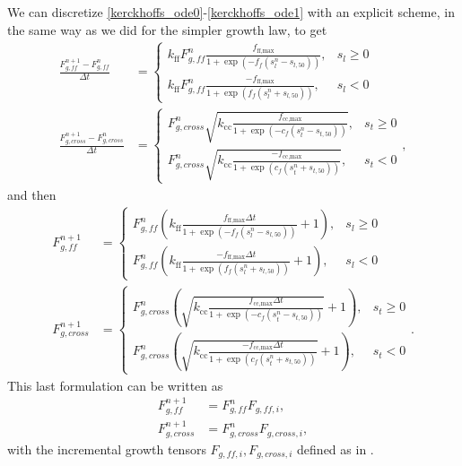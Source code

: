 \documentclass[a4paper,10pt]{article}
\begin{document}
We can discretize \eqref{kerckhoffs_ode0}-\eqref{kerckhoffs_ode1} with an explicit scheme, in the same way as we did for the
simpler growth law, to get
\begin{align}
  \frac{F_{g,ff}^{n+1} - F_{g,ff}^{n}}{\Delta t} &= \begin{cases}
    k_\text{ff} F_{g,ff}^n \frac{f_\text{ff,max} }{1 + \exp(-f_f(s_l^n - s_{l,50}))}, & s_l \geq 0 \\
    k_\text{ff} F_{g,ff}^n \frac{-f_\text{ff,max} }{1 + \exp(f_f(s_l^n + s_{l,50}))}, & s_l < 0
    \end{cases} \label{kerckhoffs_disc0}\\
    \frac{F_{g,cross}^{n+1}- F_{g,cross}^n}{\Delta t} &=
\begin{cases}
  F_{g,cross}^n \sqrt{k_\text{cc} \frac{f_\text{cc,max}  }{1 + \exp(-c_f(s_t^n - s_{t,50}))}}, & s_t \geq 0 \\
  F_{g,cross}^n \sqrt{k_\text{cc} \frac{-f_\text{cc,max} }{1 + \exp(c_f(s_t^n + s_{t,50}))}}, & s_t < 0
\end{cases}, \label{kerckhoffs_disc1}
\end{align}
and then
\begin{align}
  F_{g,ff}^{n+1} &= \begin{cases}
    F_{g,ff}^n (k_\text{ff} \frac{f_\text{ff,max} \Delta t}{1 + \exp(-f_f(s_l^n - s_{l,50}))} + 1), & s_l \geq 0 \\
    F_{g,ff}^n (k_\text{ff} \frac{-f_\text{ff,max} \Delta t}{1 + \exp(f_f(s_l^n + s_{l,50}))} + 1), & s_l < 0
    \end{cases} \label{kerckhoffs_inc0}\\
    F_{g,cross}^{n+1} &=
\begin{cases}
  F_{g,cross}^n (\sqrt{k_\text{cc} \frac{f_\text{cc,max} \Delta t }{1 + \exp(-c_f(s_t^n - s_{t,50}))}}+1), & s_t \geq 0 \\
  F_{g,cross}^n (\sqrt{k_\text{cc}\frac{-f_\text{cc,max}\Delta t }{1 + \exp(c_f(s_t^n + s_{t,50}))}}+ 1), & s_t < 0
\end{cases}. \label{kerckhoffs_inc1}
\end{align}
This last formulation can be written as
\begin{align}
  F_{g,ff}^{n+1} &= F_{g,ff}^n F_{g,ff,i},\\
  F_{g,cross}^{n+1} &= F_{g,cross}^n F_{g,cross,i},
\end{align}
with the incremental growth tensors $F_{g,ff,i}, F_{g,cross,i}$ defined as in \cite{Kerckhoffs2012MRC}. 



\end{document}

